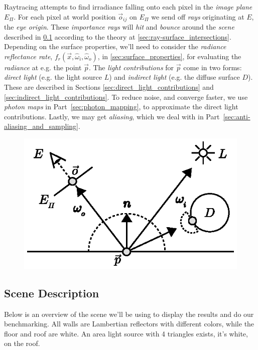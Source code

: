 \documentclass[a4paper, twocolumn]{article}
\begin{document}
        Raytracing attempts to find irradiance falling onto each pixel in the \emph{image plane} \(E_\Pi\). For each pixel at world position \(\vec{o}_{ij}\) on \(E_\Pi\) we send off \emph{rays} originating at \(E\), the \emph{eye origin}. These \emph{importance rays} will \emph{hit} and \emph{bounce} around the \emph{scene} described in \cref{sec:scene_description} according to the theory at \cref{sec:ray-surface_intersections}. Depending on the surface properties, we'll need to consider the \emph{radiance reflectance rate}, \(f_r(\vec{x}, \hat{\omega}_i, \hat{\omega}_o)\), in \cref{sec:surface_properties}, for evaluating the \emph{radiance} at e.g. the point \(\vec{p}\). The \emph{light contributions} for \(\vec{p}\) come in two forms: \emph{direct light} (e.g. the light source \(L\)) and \emph{indirect light} (e.g. the diffuse surface \(D\)). These are described in Sections \ref{sec:direct_light_contributions} and \ref{sec:indirect_light_contributions}. To reduce noise, and converge faster, we use \emph{photon maps} in Part~\ref{sec:photon_mapping}, to approximate the direct light contributions. Lastly, we may get \emph{aliasing}, which we deal with in Part~\ref{sec:anti-aliasing_and_sampling}.

        \begin{figure}[ht]
            \centering
            \includegraphics[width=0.8\linewidth]{share/raytracing_overview.eps}
            \label{fig:raytracing_overview}
        \end{figure}

        \vspace{-1.8em}

        \subsection{Scene Description} \label{sec:scene_description}

        Below is an overview of the scene we'll be using to display the results and do our benchmarking. All walls are Lambertian reflectors with different colors, while the floor and roof are white. An area light source with 4 triangles exists, it's white, on the roof.
\end{document}
